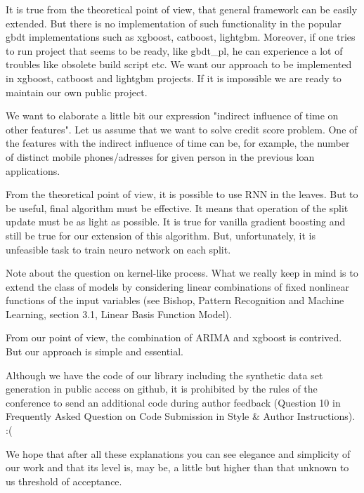 \documentclass[a4paper,12pt]{extarticle}
\begin{document}
It is true from the theoretical point of view, that general framework can be easily extended. But there is no implementation of such functionality in the popular gbdt implementations such as xgboost, catboost, lightgbm. Moreover, if one tries to run project that seems to be ready, like gbdt\_pl, he can experience a lot of troubles like obsolete build script etc. We want our approach to be implemented in xgboost, catboost and lightgbm projects. If it is impossible we are ready to maintain our own public project.

We want to elaborate a little bit our expression "indirect influence of time on other features". Let us assume that we want to solve credit score problem. One of the features with the indirect influence of time can be, for example, the number of distinct mobile phones/adresses for given person in the previous loan applications.

From the theoretical point of view, it is possible to use RNN in the leaves. But to be useful, final algorithm must be effective. It means that operation of the split update must be as light as possible. It is true for vanilla gradient boosting and still be true for our extension of this algorithm. But, unfortunately, it is unfeasible task to train neuro network on each split.  

Note about the question on kernel-like process. What we really keep in mind is to extend the class of models by considering linear combinations of fixed nonlinear functions of the input variables (see Bishop, Pattern Recognition and Machine Learning, section 3.1, Linear Basis Function Model).

From our point of view, the combination of ARIMA and xgboost is contrived. But our approach is simple and essential.

Although we have the code of our library including the synthetic data set generation in public access on github, it is prohibited by the rules of the conference to send an additional code during author feedback (Question 10 in Frequently Asked Question on Code Submission in Style \& Author Instructions).  :(

We hope that after all these explanations you can see elegance and simplicity of our work and that its level is, may be, a little but higher than that unknown to us threshold of acceptance.
\end{document}
